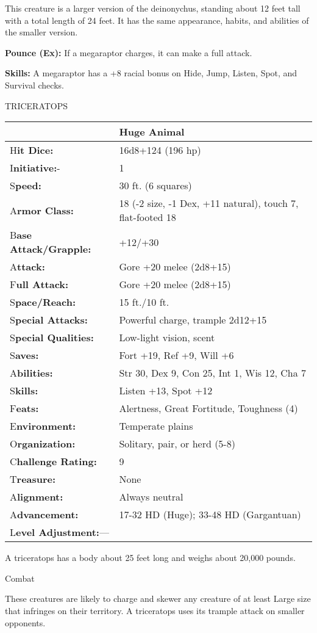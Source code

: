 \documentclass{article}
\begin{document}
This creature is a larger version of the deinonychus, standing about 12 feet tall 
with a total length of 24 feet. It has the same appearance, habits, and abilities 
of the smaller version.

\textbf{Pounce (Ex):} If a megaraptor charges, it can make a full attack. 

\textbf{Skills:} A megaraptor has a +8 racial bonus on Hide, Jump, Listen, Spot, 
and Survival checks.

\vspace{12pt}
TRICERATOPS

\begin{tabular}{|>{\raggedright}p{91pt}|>{\raggedright}p{225pt}|}
\hline
  & Huge Animal\tabularnewline
\hline
H\textbf{it Dice:} & 16d8+124 (196 hp)\tabularnewline
\hline
I\textbf{nitiative:}- & 1\tabularnewline
\hline
S\textbf{peed:} & 30 ft. (6 squares)\tabularnewline
\hline
A\textbf{rmor Class:} & 18 (-2 size, -1 Dex, +11 natural), touch 7, flat-footed 
18\tabularnewline
\hline
B\textbf{ase Attack/Grapple:} & +12/+30\tabularnewline
\hline
A\textbf{ttack:} & Gore +20 melee (2d8+15)\tabularnewline
\hline
F\textbf{ull Attack:} & Gore +20 melee (2d8+15)\tabularnewline
\hline
S\textbf{pace/Reach:} & 15 ft./10 ft.\tabularnewline
\hline
S\textbf{pecial Attacks:} & Powerful charge, trample 2d12+15\tabularnewline
\hline
S\textbf{pecial Qualities:} & Low-light vision, scent\tabularnewline
\hline
S\textbf{aves:} & Fort +19, Ref +9, Will +6\tabularnewline
\hline
A\textbf{bilities:} & Str 30, Dex 9, Con 25, Int 1, Wis 12, Cha 7\tabularnewline
\hline
S\textbf{kills:} & Listen +13, Spot +12\tabularnewline
\hline
F\textbf{eats:} & Alertness, Great Fortitude, Toughness (4)\tabularnewline
\hline
E\textbf{nvironment:} & Temperate plains\tabularnewline
\hline
O\textbf{rganization:} & Solitary, pair, or herd (5-8)\tabularnewline
\hline
C\textbf{hallenge Rating:} & 9\tabularnewline
\hline
T\textbf{reasure:} & None\tabularnewline
\hline
A\textbf{lignment:} & Always neutral\tabularnewline
\hline
A\textbf{dvancement:} & 17-32 HD (Huge); 33-48 HD (Gargantuan)\tabularnewline
\hline
L\textbf{evel Adjustment:}--- & \tabularnewline
\hline
\end{tabular}

A triceratops has a body about 25 feet long and weighs about 20,000 pounds.

Combat

These creatures are likely to charge and skewer any creature of at least Large 
size that infringes on their territory. A triceratops uses its trample attack on 
smaller opponents.
\end{document}
